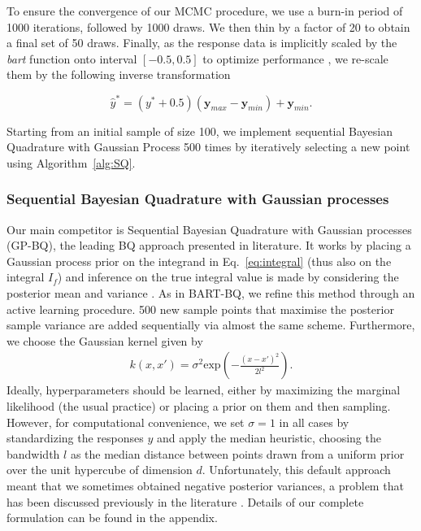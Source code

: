 To ensure the convergence of our MCMC procedure, we use a burn-in period of 1000 iterations, followed by 1000 draws. We then thin by a factor of 20 to obtain a final set of 50 draws. Finally, as the response data is implicitly scaled by the \textit{bart} function onto interval $[-0.5, 0.5]$ to optimize performance \cite{BART}, we re-scale them by the following inverse transformation 

\begin{equation}
    \hat{y}^{\ast} = (y^{\ast} + 0.5) (\boldsymbol{y}_{max} - \boldsymbol{y}_{min}) + \boldsymbol{y}_{min} .
\end{equation}

Starting from an initial sample of size 100, we implement sequential Bayesian Quadrature with Gaussian Process 500 times by iteratively selecting a new point using Algorithm~\ref{alg:SQ}.

\subsubsection{Sequential Bayesian Quadrature with Gaussian processes}
Our main competitor is Sequential Bayesian Quadrature with Gaussian processes (GP-BQ), the leading BQ approach presented in literature. It works by placing a Gaussian process prior on the integrand in Eq.~\eqref{eq:integral} (thus also on the integral $I_f$) and inference on the true integral value is made by considering the posterior mean and variance \cite{Rasmussen:2005:GPM:1162254}. As in BART-BQ, we refine this method through an active learning procedure. 500 new sample points that maximise the posterior sample variance are added sequentially via almost the same scheme. Furthermore, we choose the Gaussian kernel given by
\begin{align}
    k(x, x') = \sigma^2\text{exp}\left(-\frac{(x-x')^2}{2l^2}\right).
\end{align}
Ideally, hyperparameters should be learned, either by maximizing the marginal likelihood (the usual practice) or placing a prior on them and then sampling. However, for computational convenience, we set $\sigma = 1$ in all cases by standardizing the responses $y$ and apply the median heuristic, choosing the bandwidth $l$ as the median distance between points drawn from a uniform prior over the unit hypercube of dimension $d$.
Unfortunately, this default approach meant that we sometimes obtained negative posterior variances, a problem that has been discussed previously in the literature \cite{Rasmussen:2002:BMC:2968618.2968681}. Details of our complete formulation can be found in the appendix.

